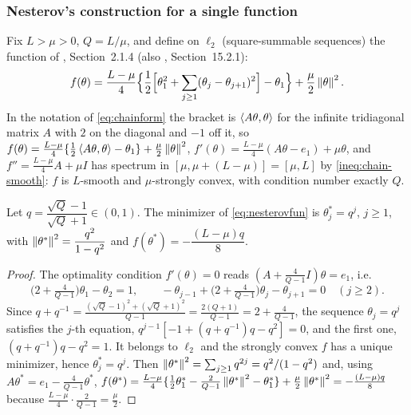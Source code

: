 \subsubsection{Nesterov's construction for a single function}

Fix $L>\mu>0$, $Q=L/\mu$, and define on $\ell_2$ (square-summable sequences) the function of \cite{nesterov2018lectures}, Section~2.1.4 (also \cite{bach2024learning}, Section~15.2.1):
\begin{equation}
\label{eq:nesterovfun}
f(\theta)=\frac{L-\mu}{4}\Big\{\frac12\Big[\theta_1^2+\sum_{j\ge1}(\theta_j-\theta_{j+1})^2\Big]-\theta_1\Big\}+\frac\mu2\left\|\theta\right\|^2 .
\end{equation}
In the notation of \eqref{eq:chainform} the bracket is $\left\langle A\theta, \theta \right\rangle$ for the infinite tridiagonal matrix $A$ with $2$ on the diagonal and $-1$ off it, so $f(\theta)=\frac{L-\mu}{4}\{\frac12\left\langle A\theta, \theta \right\rangle-\theta_1\}+\frac\mu2\left\|\theta\right\|^2$, $f'(\theta)=\frac{L-\mu}{4}(A\theta-e_1)+\mu\theta$, and $f''=\frac{L-\mu}{4}A+\mu I$ has spectrum in $[\mu,\mu+(L-\mu)]=[\mu,L]$ by \eqref{ineq:chain-smooth}: $f$ is $L$-smooth and $\mu$-strongly convex, with condition number exactly $Q$.

\begin{proposition}
\label{prop:nesterov-min}
Let $q=\dfrac{\sqrt Q-1}{\sqrt Q+1}\in(0,1)$. The minimizer of \eqref{eq:nesterovfun} is $\theta^\ast_j=q^j$, $j\ge1$, with $\left\|\theta^\ast\right\|^2=\dfrac{q^2}{1-q^2}$ and $f(\theta^\ast)=-\dfrac{(L-\mu)q}{8}$.
\end{proposition}

\begin{proof}
The optimality condition $f'(\theta)=0$ reads $(A+\frac{4}{Q-1}I)\theta=e_1$, i.e.
\[
\Big(2+\tfrac{4}{Q-1}\Big)\theta_1-\theta_2=1,\qquad -\theta_{j-1}+\Big(2+\tfrac4{Q-1}\Big)\theta_j-\theta_{j+1}=0\quad(j\ge2).
\]
Since $q+q^{-1}=\frac{(\sqrt Q-1)^2+(\sqrt Q+1)^2}{Q-1}=\frac{2(Q+1)}{Q-1}=2+\frac4{Q-1}$, the sequence $\theta_j=q^j$ satisfies the $j$-th equation, $q^{j-1}[-1+(q+q^{-1})q-q^2]=0$, and the first one, $(q+q^{-1})q-q^2=1$. It belongs to $\ell_2$ and the strongly convex $f$ has a unique minimizer, hence $\theta^\ast_j=q^j$. Then $\left\|\theta^\ast\right\|^2=\sum_{j\ge1}q^{2j}=q^2/(1-q^2)$ and, using $A\theta^\ast=e_1-\frac4{Q-1}\theta^\ast$, $f(\theta^\ast)=\frac{L-\mu}4\{\frac12\theta^\ast_1-\frac2{Q-1}\left\|\theta^\ast\right\|^2-\theta^\ast_1\}+\frac\mu2\left\|\theta^\ast\right\|^2=-\frac{(L-\mu)q}{8}$ because $\frac{L-\mu}{4}\cdot\frac{2}{Q-1}=\frac\mu2$.
\end{proof}

